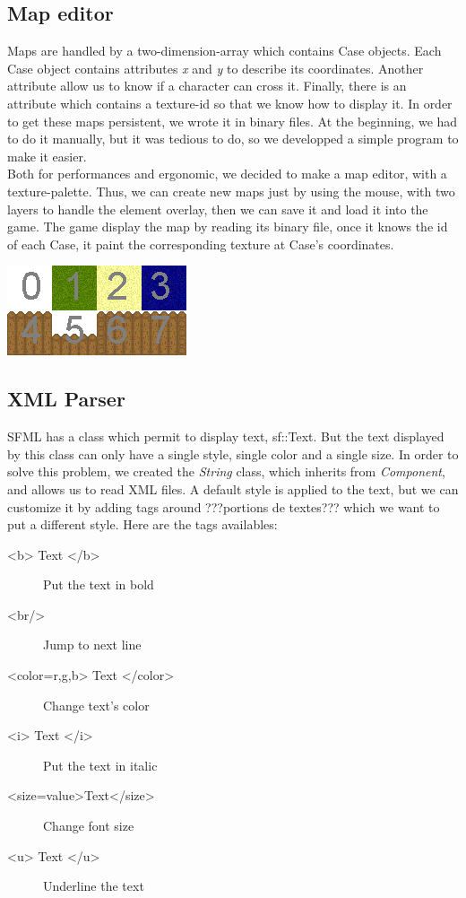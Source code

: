 \documentclass{scrreprt}
\begin{document}
		  \subsection{Map editor}
		Maps are handled by a two-dimension-array which contains Case objects. Each Case object contains attributes \emph{x} and \emph{y} to describe its coordinates. Another attribute allow us to know if a character can cross it. Finally, there is an attribute which contains a texture-id so that we know how to display it. In order to get these maps persistent, we wrote it in binary files. At the beginning, we had to do it manually, but it was tedious to do, so we developped a simple program to make it easier.\\

		Both for performances and ergonomic, we decided to make a map editor, with a texture-palette. Thus, we can create new maps just by using the mouse, with two layers to handle the element overlay, then we can save it and load it into the game. The game display the map by reading its binary file, once it knows the id of each Case, it paint the corresponding texture at Case's coordinates.

		\begin{center}
		\includegraphics{image1.png}
		\end{center}
		
		\subsection{XML Parser}
		SFML has a class which permit to display text, sf::Text. But the text displayed by this class can only have a single style, single color and a single size. In order to solve this problem, we created the \emph{String} class, which inherits from \emph{Component}, and allows us to read XML files. A default style is applied to the text, but we can customize it by adding tags around ???portions de textes??? which we want to put a different style. Here are the tags availables:
		\begin{description}
		\item[<b> Text </b>]{Put the text in bold}
		\item[<br/>]{Jump to next line}
		\item[<color=r,g,b> Text </color>]{Change text's color}
		\item[<i> Text </i>]{Put the text in italic}
		\item[<size=value>Text</size>]{Change font size}
		\item[<u> Text </u>]{Underline the text}
		\end{description}
\end{document}
